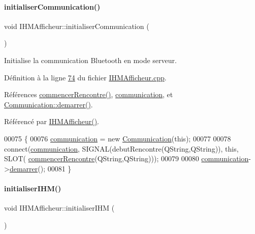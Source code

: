 \paragraph{\texorpdfstring{initialiser\+Communication()}{initialiserCommunication()}}
{\footnotesize\ttfamily void I\+H\+M\+Afficheur\+::initialiser\+Communication (\begin{DoxyParamCaption}{ }\end{DoxyParamCaption})\hspace{0.3cm}{\ttfamily [private]}}



Initialise la communication Bluetooth en mode serveur. 



Définition à la ligne \hyperlink{_i_h_m_afficheur_8cpp_source_l00074}{74} du fichier \hyperlink{_i_h_m_afficheur_8cpp_source}{I\+H\+M\+Afficheur.\+cpp}.



Références \hyperlink{_i_h_m_afficheur_8cpp_source_l00090}{commencer\+Rencontre()}, \hyperlink{_i_h_m_afficheur_8h_source_l00041}{communication}, et \hyperlink{_communication_8cpp_source_l00073}{Communication\+::demarrer()}.



Référencé par \hyperlink{_i_h_m_afficheur_8cpp_source_l00022}{I\+H\+M\+Afficheur()}.


\begin{DoxyCode}
00075 \{
00076     \hyperlink{class_i_h_m_afficheur_a331b5544e96cc908336a1486b52c379b}{communication} = \textcolor{keyword}{new} \hyperlink{class_communication}{Communication}(\textcolor{keyword}{this});
00077 
00078     connect(\hyperlink{class_i_h_m_afficheur_a331b5544e96cc908336a1486b52c379b}{communication}, SIGNAL(debutRencontre(QString,QString)), \textcolor{keyword}{this}, SLOT(
      \hyperlink{class_i_h_m_afficheur_ad2dc0742d9cdda731a16c570fd6f2434}{commencerRencontre}(QString,QString)));
00079 
00080     \hyperlink{class_i_h_m_afficheur_a331b5544e96cc908336a1486b52c379b}{communication}->\hyperlink{class_communication_af29ea9a1c2ce29436f2331c322f6ebbf}{demarrer}();
00081 \}
\end{DoxyCode}
\mbox{\label{class_i_h_m_afficheur_a119539fa51bf2e091e77faedf82eb146}} 
\paragraph{\texorpdfstring{initialiser\+I\+H\+M()}{initialiserIHM()}}
{\footnotesize\ttfamily void I\+H\+M\+Afficheur\+::initialiser\+I\+HM (\begin{DoxyParamCaption}{ }\end{DoxyParamCaption})\hspace{0.3cm}{\ttfamily [private]}}




